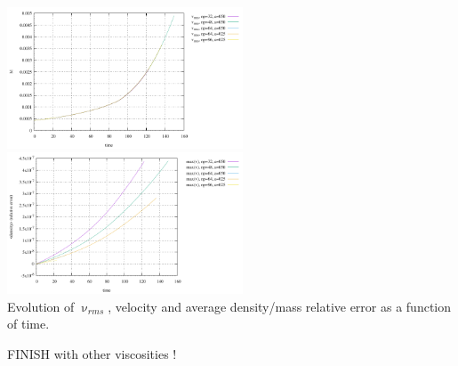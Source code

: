 \begin{center}
\includegraphics[width=7cm]{python_codes/fieldstone_93/results_exp4/vel_time}
\includegraphics[width=7cm]{python_codes/fieldstone_93/results_exp4/avrg_rho_time}\\
{\captionfont Evolution of $\upnu_{rms}$, velocity and average density/mass relative
error as a function of time.}
\end{center} 



FINISH with other viscosities !


